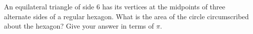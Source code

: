 An equilateral triangle of side $6$ has its vertices at the midpoints of three alternate sides of a regular hexagon. What is the area of the circle circumscribed about the hexagon? Give your answer in terms of $\pi$.
